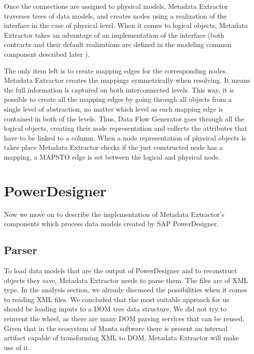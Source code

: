Once the connections are assigned to physical models, Metadata Extractor traverses trees of data models, and creates nodes using a realization of the  interface in the case of physical level. 
When it comes to logical objects, Metadata Extractor takes an advantage of an implementation of the  interface (both contracts and their default realizations are defined in the modeling common component described later ).

The only item left is to create mapping edges for the corresponding nodes.
Metadata Extractor creates the mappings symmetrically when resolving. It means the full information is captured on both interconnected levels. 
This way, it is possible to create all the mapping edges by going through all objects from a single level of abstraction, no matter which level as each mapping edge is contained in both of the levels.
Thus, Data Flow Generator goes through all the logical objects, creating their node representation and collects the attributes that have to be linked to a column.
When a node representation of physical objects is takes place Metadata Extractor checks if the just constructed node has a mapping, a MAPS\textunderscore TO edge is set between the logical and physical node.

\section{PowerDesigner}

Now we move on to describe the implementation of Metadata Extractor's components which process data models created by SAP PowerDesigner.

\subsection{Parser}

To load data models that are the output of PowerDesigner and to reconstruct objects they save, Metadata Extractor needs to parse them. The files are of XML type.
In the analysis section, we already discussed the possibilities when it comes to reading XML files. We concluded that the most suitable approach for us should be loading inputs to a DOM tree data structure.
We did not try to reinvent the wheel, as there are many DOM parsing services that can be reused. 
Given that in the ecosystem of Manta software there is present an internal artifact capable of transforming XML to DOM, Metadata Extractor will make use of it.

